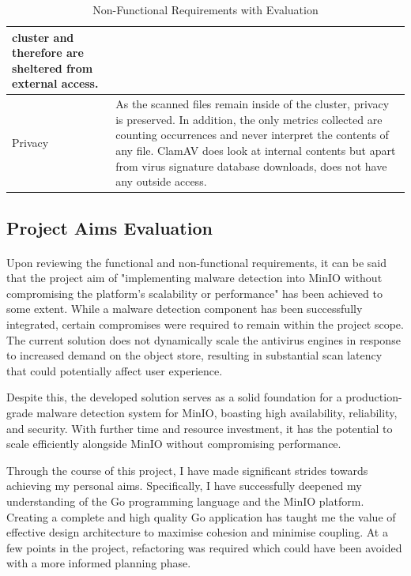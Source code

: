 \documentclass[12pt, conference, final, a4paper, onecolumn, compsoc]{IEEEtran}
\begin{document}
\begin{table}[H]
\begin{tabular}{|p{}|p{}|}
               cluster and therefore are sheltered from external access. \\ \hline
    Privacy & As the scanned files remain inside of the cluster, privacy is
    preserved. In addition, the only metrics collected are counting occurrences
              and never interpret the contents of any file. ClamAV does look at
              internal contents but apart from virus signature database
              downloads, does not have any outside access. \\ \hline
  \end{tabular}
  \caption{Non-Functional Requirements with Evaluation}
  \label{tab:non-functional-reqs-evaluation}
\end{table}

\subsection{Project Aims Evaluation}
\paragraph{}

Upon reviewing the functional and non-functional requirements, it can be said
that the project aim of "implementing malware detection into MinIO without
compromising the platform's scalability or performance" has been achieved to
some extent. While a malware detection component has been successfully
integrated, certain compromises were required to remain within the project
scope. The current solution does not dynamically scale the antivirus engines in
response to increased demand on the object store, resulting in substantial scan
latency that could potentially affect user experience.

Despite this, the developed solution serves as a solid foundation for a
production-grade malware detection system for MinIO, boasting high availability,
reliability, and security. With further time and resource investment, it has the
potential to scale efficiently alongside MinIO without compromising performance.

Through the course of this project, I have made significant strides towards
achieving my personal aims. Specifically, I have successfully deepened my
understanding of the Go programming language and the MinIO platform. Creating a
complete and high quality Go application has taught me the value of effective
design architecture to maximise cohesion and minimise coupling. At a few points
in the project, refactoring was required which could have been avoided with
a more informed planning phase.
\end{document}
